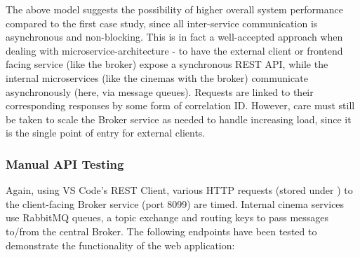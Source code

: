 The above model suggests the possibility of higher overall system performance compared to the first case study, since all inter-service communication is asynchronous and non-blocking. This is in fact a well-accepted approach when dealing with microservice-architecture - to have the external client or frontend facing service (like the broker) expose a synchronous REST API, while the internal microservices (like the cinemas with the broker) communicate asynchronously (here, via message queues).
Requests are linked to their corresponding responses by some form of correlation ID. However, care must still be taken to scale the Broker service as needed to handle increasing load, since it is the single point of entry for external clients.

\subsubsection{Manual API Testing}

Again, using VS Code's REST Client, various HTTP requests (stored under ) to the client-facing Broker service (port 8099) are timed. Internal cinema services use RabbitMQ queues, a topic exchange and routing keys to pass messages to/from the central Broker. The following endpoints have been tested to demonstrate the functionality of the web application:

